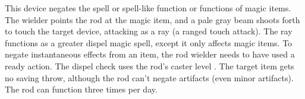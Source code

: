 \begin{comment}
\prereq{Craft Rod, Enlarge Spell}

\itemdescription{Metamagic, Extend}{(Lesser) 4,500 gp (7th}; (normal) 10,000 gp (10th); (greater) 18,000}{12th}{\tdash}{(Lesser) 8th; (normal) 12th; (greater) 16th}{(Lesser) faint (no school); (normal) moderate (no school); (greater) strong (no school)}{\tdash} The wielder can cast up to three spells per day that are extended as though using the Extend Spell feat.

\prereq{Craft Rod, Extend Spell}

\itemdescription{Metamagic, Maximize}{(Lesser) 12,500 gp (11th); (normal) 21,000 gp  (13th); 32,000}{15th}{\tdash}{(Lesser) 8th; (normal) 12th; (greater) 16th}{(Lesser) faint (no school); (normal) moderate (no school); (greater) strong (no school)}{\tdash} The wielder can cast up to three spells per day that are maximized as though using the Maximize Spell feat.

Strong (no school); CL 17th; Craft Rod, Maximize Spell feat; Price 14,000 gp (lesser), 54,000 gp (normal), 121,500 gp (greater).

\itemdescription{Metamagic, Quicken}{(Lesser) 18,000 gp (11th); (normal) 21,000 gp  (13th); 32,000}{15th}{\tdash}{(Lesser) 8th; (normal) 12th; (greater) 16th}{(Lesser) faint (no school); (normal) moderate (no school); (greater) strong (no school)}{\tdash}
\parhead{Metamagic, Quicken} The wielder can cast up to three spells per day that are quickened as though using the Quicken Spell feat.

Strong (no school); CL 17th; Craft Rod, Quicken Spell; Price 35,000 gp (lesser), 75,500 gp (normal), 170,000 gp (greater).

\parhead{Metamagic, Silent} The wielder can cast up to three spells per day without verbal components as though using the Silent Spell feat.

Strong (no school); CL 17th; Craft Rod, Silent Spell; Price 3,000 gp (lesser), 11,000 gp (normal), 24,500 gp (greater).
\end{comment}

 This device negates the spell or spell-like function or functions of magic items. The wielder points the rod at the magic item, and a pale gray beam shoots forth to touch the target device, attacking as a ray (a ranged touch attack). The ray functions as a greater dispel magic spell, except it only affects magic items. To negate instantaneous effects from an item, the rod wielder needs to have used a ready action. The dispel check uses the rod's caster level . The target item gets no saving throw, although the rod can't negate artifacts (even minor artifacts). The rod can function three times per day.

